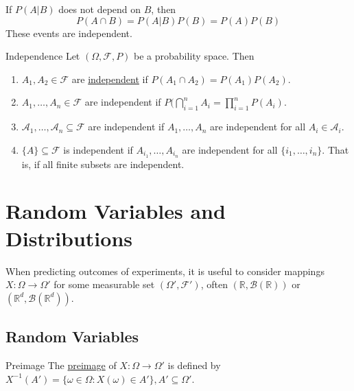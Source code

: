 \documentclass{article}
\newcommand{\R}{\mathbb{R}}
\begin{document}
	
	If $P(A|B)$ does not depend on $B$, then $$P(A\cap B)=P(A|B)P(B)=P(A)P(B)$$
	These events are independent.
	\begin{mydef}{Independence}{}
		Let $(\Omega, \mathcal{F}, P)$ be a probability space. Then
		\begin{enumerate}[label=(\roman*)]
			\item $A_1, A_2\in\mathcal{F}$ are \underline{independent} if $P(A_1\cap A_2)=P(A_1)P(A_2)$.
			
			\item $A_1, \dots, A_n\in\mathcal{F}$ are independent if $P(\bigcap_{i=1}^{n}A_i=\prod_{i=1}^{n}P(A_i)$.
			
			\item $\mathcal{A}_1, \dots, \mathcal{A}_n\subseteq\mathcal{F}$ are independent if $A_1, \dots, A_n$ are independent for all $A_i\in\mathcal{A}_i$.
			
			\item $\{A\}\subseteq\mathcal{F}$ is independent if $A_{i_1}, \dots, A_{i_n}$ are independent for all $\{i_1, \dots, i_n\}$. That is, if all finite subsets are independent.
		\end{enumerate}
	\end{mydef}
	
	\newpage
	\section{Random Variables and Distributions}
	When predicting outcomes of experiments, it is useful to consider mappings $X : \Omega\to\Omega'$ for some measurable set $(\Omega', \mathcal{F}')$, often $(\R, \mathcal{B}(\R))$ or $(\R^d, \mathcal{B}(\R^d))$.
	
	\subsection{Random Variables}
	\begin{mydef}{Preimage}{}
		The \underline{preimage} of $X : \Omega\to\Omega'$ is defined by $X^{-1}(A')=\{\omega\in\Omega : X(\omega)\in A'\}, A'\subseteq\Omega'$.
	\end{mydef}
	
\end{document}
